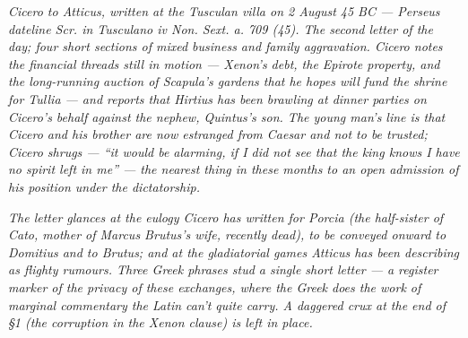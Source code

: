 
\textit{Cicero to Atticus, written at the Tusculan villa on 2 August
45 BC --- Perseus dateline \textit{Scr. in Tusculano iv Non. Sext.
a. 709 (45)}. The second letter of the day; four short sections
of mixed business and family aggravation. Cicero notes the
financial threads still in motion --- Xenon's debt, the Epirote
property, and the long-running auction of Scapula's gardens that
he hopes will fund the shrine for Tullia --- and reports that
Hirtius has been brawling at dinner parties on Cicero's behalf
against the nephew, Quintus's son. The young man's line is that
Cicero and his brother are now estranged from Caesar and not to
be trusted; Cicero shrugs --- ``it would be alarming, if I did not
see that the king knows I have no spirit left in me'' --- the
nearest thing in these months to an open admission of his
position under the dictatorship.}

\textit{The letter glances at the eulogy Cicero has written for
Porcia (the half-sister of Cato, mother of Marcus Brutus's wife,
recently dead), to be conveyed onward to Domitius and to Brutus;
and at the gladiatorial games Atticus has been describing as
\textit{flighty rumours}. Three Greek phrases stud a single
short letter --- a register marker of the privacy of these
exchanges, where the Greek does the work of marginal commentary
the Latin can't quite carry. A daggered crux at the end of
\S 1 (the corruption in the Xenon clause) is left in place.}
